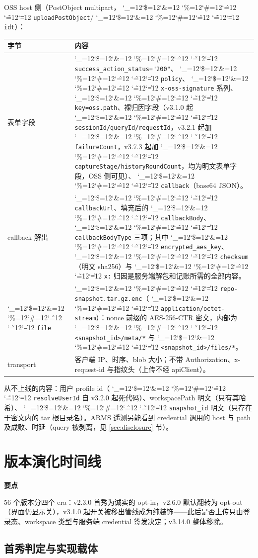 \documentclass[11pt,a4paper,fontset=none]{ctexart}
\newcommand{\cid}{%
  \begingroup
  \catcode`\_=12\relax \catcode`\$=12\relax \catcode`\&=12\relax
  \catcode`\%=12\relax \catcode`\#=12\relax \catcode`\^=12\relax
  \catcode`\~=12\relax \catcode`\|=12\relax
  \codeSpan}
\newcommand{\codeSpan}[1]{{\small\texttt{#1}}\endgroup}
\newenvironment{takeaway}{%
  \begin{mdframed}[backgroundcolor=black!4,linecolor=black!20,
    linewidth=0.5pt,skipabove=7pt,skipbelow=7pt,
    innertopmargin=5pt,innerbottommargin=5pt,
    innerleftmargin=8pt,innerrightmargin=8pt]
  \small\textbf{要点}\quad\ignorespaces
}{\end{mdframed}}
\begin{document}
OSS host 侧（PostObject multipart，\cid{uploadPostObject}/\cid{idt}）：

\begin{table}[htbp]
\centering\small
\begin{tabular}{@{}p{3.4cm}p{11.8cm}@{}}
\toprule
字节 & 内容 \\
\midrule
表单字段 & \cid{success_action_status="200"}、\cid{policy}、\cid{x-oss-signature} 系列、\cid{key=oss.path}、裸归因字段（v3.1.0 起 \cid{sessionId/queryId/requestId}，v3.2.1 起加 \cid{failureCount}，v3.7.3 起加 \cid{captureStage/historyRoundCount}，均为明文表单字段，OSS 侧可见）、\cid{callback}（base64 JSON）。 \\
callback 解出 & \cid{callbackUrl}、填充后的 \cid{callbackBody}、\cid{callbackBodyType} 三项；其中 \cid{encrypted_aes_key}、\cid{checksum}（明文 sha256）与 \cid{x:} 归因是服务端解包和记账所需的全部内容。 \\
\cid{file} & \cid{repo-snapshot.tar.gz.enc}（\cid{application/octet-stream}）：nonce 前缀的 AES-256-CTR 密文，内部为 \cid{<snapshot_id>/meta/*} 与 \cid{<snapshot_id>/files/*}。 \\
transport & 客户端 IP、时序、blob 大小；不带 Authorization、x-request-id 与指纹头（上传不经 apiClient）。 \\
\bottomrule
\end{tabular}
\end{table}

从不上线的内容：用户 profile id（\cid{resolveUserId} 自 v3.2.0 起死代码）、workspacePath 明文（只有其哈希）、\cid{snapshot_id} 明文（只存在于密文内的 tar 根目录名）。ARMS 遥测另能看到 credential 调用的 host 与 path 及成败、时延（query 被剥离，见 \ref{sec:disclosure} 节）。

\section{版本演化时间线}

\begin{takeaway}
56 个版本分四个 era：v2.3.0 首秀为诚实的 opt-in，v2.6.0 默认翻转为 opt-out（界面仍显示关），v3.1.0 起开关被移出管线成为纯装饰——此后是否上传只由登录态、workspace 类型与服务端 credential 签发决定；v3.14.0 整体移除。
\end{takeaway}

\subsection{首秀判定与实现载体}
\end{document}
